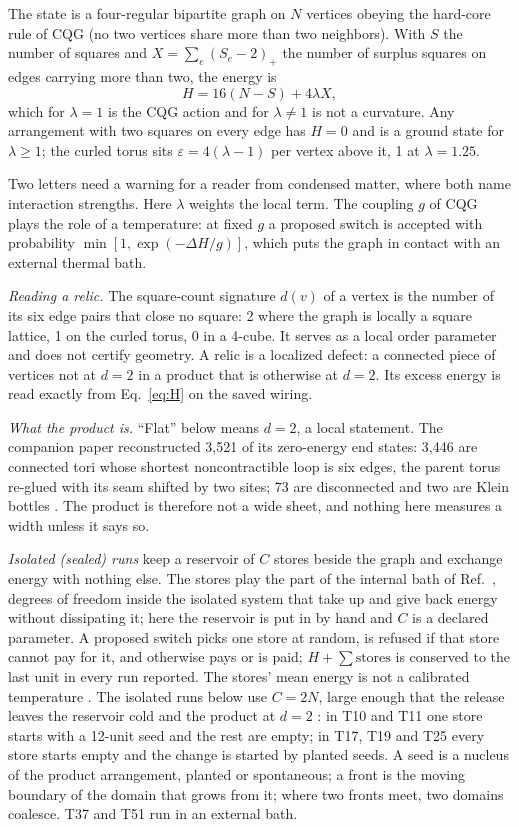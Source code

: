 \documentclass[aps,pre,10pt,twocolumn,superscriptaddress,nofootinbib]{revtex4-2}
\begin{document}
The state is a four-regular bipartite graph on $N$ vertices obeying the hard-core rule of CQG (no two vertices
share more than two neighbors). With $S$ the number of squares and $X = \sum_e (S_e - 2)_+$ the number of
surplus squares on edges carrying more than two, the energy is
\begin{equation}
  H = 16(N - S) + 4\lambda X,
  \label{eq:H}
\end{equation}
which for $\lambda = 1$ is the CQG action \cite{T25} and for $\lambda \ne 1$ is not a curvature. Any
arrangement with two squares on every edge has $H = 0$ and is a ground state for $\lambda \ge 1$; the curled
torus sits $\varepsilon = 4(\lambda - 1)$ per vertex above it, 1 at $\lambda = 1.25$.

Two letters need a warning for a reader from condensed matter, where both name interaction strengths. Here
$\lambda$ weights the local term. The coupling $g$ of CQG plays the role of a temperature: at fixed $g$ a
proposed switch is accepted with probability $\min[1,\exp(-\Delta H/g)]$, which puts the graph in contact with
an external thermal bath.

\emph{Reading a relic.} The square-count signature $d(v)$ of a vertex is the number of its six edge pairs that
close no square: 2 where the graph is locally a square lattice, 1 on the curled torus, 0 in a 4-cube. It serves
as a local order parameter and does not certify geometry. A relic is a localized defect: a connected piece of
vertices not at $d = 2$ in a product that is otherwise at $d = 2$. Its excess energy is read exactly from
Eq.~\eqref{eq:H} on the saved wiring.

\emph{What the product is.} ``Flat'' below means $d = 2$, a local statement. The companion paper reconstructed
3,521 of its zero-energy end states: 3,446 are connected tori whose shortest noncontractible loop is six edges,
the parent torus re-glued with its seam shifted by two sites; 73 are disconnected and two are Klein bottles
\cite{paper1}. The product is therefore not a wide sheet, and nothing here measures a width unless it says so.

\emph{Isolated (sealed) runs} keep a reservoir of $C$ stores beside the graph and exchange energy with nothing
else. The stores play the part of the internal bath of Ref.~\cite{JC26}, degrees of freedom inside the isolated
system that take up and give back energy without dissipating it; here the reservoir is put in by hand and $C$ is
a declared parameter. A proposed switch picks one store at random, is refused if that store cannot pay for it,
and otherwise pays or is paid; $H + \sum \text{stores}$ is conserved to the last unit in every run reported.
The stores' mean energy is not a calibrated temperature \cite{paper1}. The isolated runs below use $C = 2N$,
large enough that the release leaves the reservoir cold and the product at $d = 2$ \cite{paper1}: in T10 and T11
one store starts with a 12-unit seed and the rest are empty; in T17, T19 and T25 every store starts empty and the
change is started by planted seeds. A seed is a nucleus of the product arrangement, planted or spontaneous; a
front is the moving boundary of the domain that grows from it; where two fronts meet, two domains coalesce. T37
and T51 run in an external bath.
\end{document}
